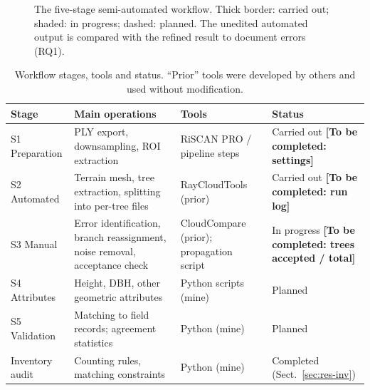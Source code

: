 \documentclass[runningheads]{llncs}
\newcommand{\todo}[1]{\textbf{[To be completed: #1]}}
\begin{document}
\begin{figure}[!tb]
\centering
{}
\caption{The five-stage semi-automated workflow. Thick border: carried out; shaded: in progress; dashed: planned. The unedited automated output is compared with the refined result to document errors (RQ1).}\label{fig:pipeline}
\end{figure}

\begin{table}[!tb]
\caption{Workflow stages, tools and status. ``Prior'' tools were developed by others and used without modification.}\label{tab:stages}
\centering\footnotesize
\begin{tabular}{@{}L{1.95cm}L{3.55cm}L{2.55cm}L{3.0cm}@{}}
\toprule
Stage & Main operations & Tools & Status\\
\midrule
S1 Preparation & PLY export, downsampling, ROI extraction & RiSCAN PRO / pipeline steps~\cite{pipeline} & Carried out \todo{settings}\\
S2 Automated & Terrain mesh, tree extraction, splitting into per-tree files & RayCloudTools (prior)~\cite{lowe2021} & Carried out \todo{run log}\\
S3 Manual & Error identification, branch reassignment, noise removal, acceptance check & CloudCompare (prior); propagation script~\cite{pipeline} & In progress \todo{trees accepted / total}\\
S4 Attributes & Height, DBH, other geometric attributes & Python scripts (mine) & Planned\\
S5 Validation & Matching to field records; agreement statistics & Python (mine) & Planned\\
Inventory audit & Counting rules, matching constraints & Python (mine) & Completed (Sect.~\ref{sec:res-inv})\\
\bottomrule
\end{tabular}
\end{table}
\end{document}
